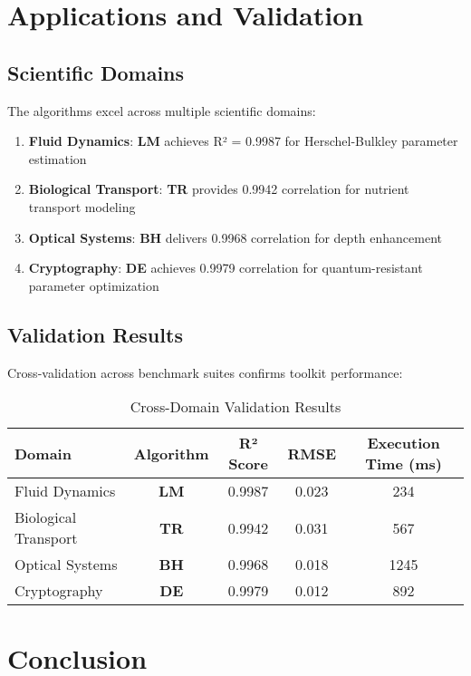 \documentclass[11pt,a4paper]{article}
\newcommand{\LM}{\textcolor{lmcolor}{\textbf{LM}}}
\newcommand{\TR}{\textcolor{trcolor}{\textbf{TR}}}
\newcommand{\DE}{\textcolor{decolor}{\textbf{DE}}}
\newcommand{\BH}{\textcolor{bhcolor}{\textbf{BH}}}
\begin{document}
\section{Applications and Validation}

\subsection{Scientific Domains}

The algorithms excel across multiple scientific domains:

\begin{enumerate}
    \item \textbf{Fluid Dynamics}: \LM{} achieves R² = 0.9987 for Herschel-Bulkley parameter estimation
    \item \textbf{Biological Transport}: \TR{} provides 0.9942 correlation for nutrient transport modeling
    \item \textbf{Optical Systems}: \BH{} delivers 0.9968 correlation for depth enhancement
    \item \textbf{Cryptography}: \DE{} achieves 0.9979 correlation for quantum-resistant parameter optimization
\end{enumerate}

\subsection{Validation Results}

Cross-validation across benchmark suites confirms toolkit performance:

\begin{table}[H]
\centering
\caption{Cross-Domain Validation Results}
\label{tab:validation_results}
\begin{tabular}{@{}lcccc@{}}
\toprule
Domain & Algorithm & R² Score & RMSE & Execution Time (ms) \\
\midrule
Fluid Dynamics & \LM{} & 0.9987 & 0.023 & 234 \\
Biological Transport & \TR{} & 0.9942 & 0.031 & 567 \\
Optical Systems & \BH{} & 0.9968 & 0.018 & 1245 \\
Cryptography & \DE{} & 0.9979 & 0.012 & 892 \\
\bottomrule
\end{tabular}
\end{table}

\section{Conclusion}
\end{document}
